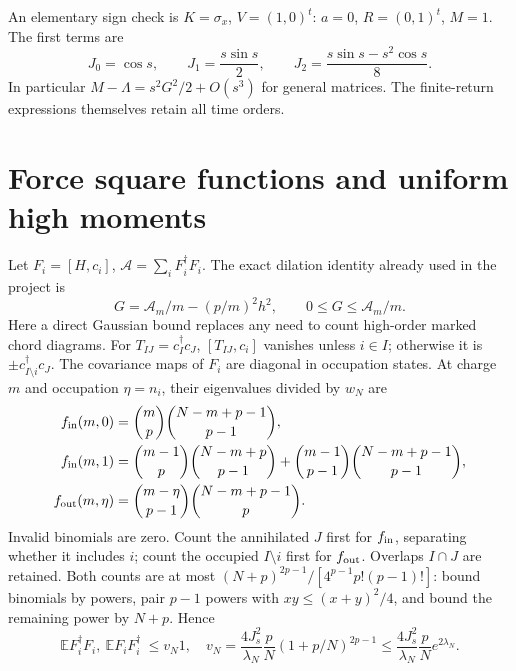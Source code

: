 \documentclass[11pt,a4paper]{article}
\newcommand{\EE}{\mathbb E}
\begin{document}
An elementary sign check is $K=\sigma_x$, $V=(1,0)^t$:
$a=0$, $R=(0,1)^t$, $M=1$. The first terms are
\begin{equation}
 J_0=\cos s,\qquad J_1=\frac{s\sin s}{2},\qquad
 J_2=\frac{s\sin s-s^2\cos s}{8}.
\end{equation}
In particular $M-\Lambda=s^2G^2/2+O(s^3)$ for general matrices.
The finite-return expressions themselves retain all time orders.

\newpage
\section{Force square functions and uniform high moments}
Let $F_i=[H,c_i]$, $\mathcal A=\sum_iF_i^\dagger F_i$.
The exact dilation identity already used in the project is
\begin{equation}
 G=\mathcal A_m/m-(p/m)^2h^2,\qquad 0\leq G\leq\mathcal A_m/m.
\end{equation}
Here a direct Gaussian bound replaces any need to count high-order
marked chord diagrams. For $T_{IJ}=c_I^\dagger c_J$,
$[T_{IJ},c_i]$ vanishes unless $i\in I$; otherwise it is
$\pm c_{I\setminus i}^\dagger c_J$.
The covariance maps of $F_i$ are diagonal in occupation states.
At charge $m$ and occupation $\eta=n_i$, their eigenvalues divided
by $w_N$ are
\begin{align}
 f_{\rm in}(m,0)&=\binom mp\binom{N-m+p-1}{p-1},\\
 f_{\rm in}(m,1)&=\binom{m-1}p\binom{N-m+p}{p-1}
 +\binom{m-1}{p-1}\binom{N-m+p-1}{p-1},\\
 f_{\rm out}(m,\eta)&=\binom{m-\eta}{p-1}\binom{N-m+p-1}p.
\end{align}
Invalid binomials are zero. Count the annihilated $J$ first for
$f_{\rm in}$, separating whether it includes $i$; count the occupied
$I\setminus i$ first for $f_{\rm out}$. Overlaps $I\cap J$ are retained.
Both counts are at most
$(N+p)^{2p-1}/[4^{p-1}p!(p-1)!]$: bound binomials by powers,
pair $p-1$ powers with $xy\leq(x+y)^2/4$, and bound the remaining
power by $N+p$. Hence
\begin{equation}
 \EE F_i^\dagger F_i,\ \EE F_iF_i^\dagger\ \leq v_N1,\quad
 v_N=\frac{4J_s^2}{\lambda_N}\frac pN(1+p/N)^{2p-1}
 \leq\frac{4J_s^2}{\lambda_N}\frac pN e^{2\lambda_N}.\label{eq:v}
\end{equation}
\end{document}
